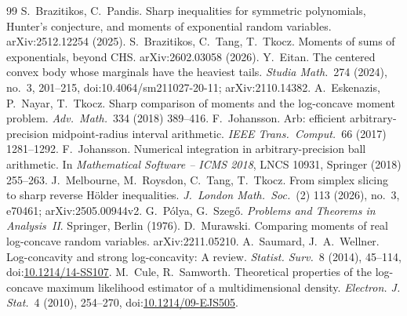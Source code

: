 \documentclass[11pt]{article}
\theoremstyle{remark}
\begin{document}
\begin{thebibliography}{99}
 S.~Brazitikos, C.~Pandis. Sharp inequalities for symmetric polynomials, Hunter's conjecture, and moments of exponential random variables. arXiv:2512.12254 (2025).
 S.~Brazitikos, C.~Tang, T.~Tkocz. Moments of sums of exponentials, beyond CHS. arXiv:2602.03058 (2026).
 Y.~Eitan. The centered convex body whose marginals have the heaviest tails. \emph{Studia Math.}\ 274 (2024), no.~3, 201--215, doi:10.4064/sm211027-20-11; arXiv:2110.14382.
 A.~Eskenazis, P.~Nayar, T.~Tkocz. Sharp comparison of moments and the log-concave moment problem. \emph{Adv.\ Math.}\ 334 (2018) 389--416.
 F.~Johansson. Arb: efficient arbitrary-precision midpoint-radius interval arithmetic. \emph{IEEE Trans.\ Comput.}\ 66 (2017) 1281--1292.
 F.~Johansson. Numerical integration in arbitrary-precision ball arithmetic. In \emph{Mathematical Software -- ICMS 2018}, LNCS 10931, Springer (2018) 255--263.
 J.~Melbourne, M.~Roysdon, C.~Tang, T.~Tkocz. From simplex slicing to sharp reverse H\"older inequalities. \emph{J.\ London Math.\ Soc.}\ (2) 113 (2026), no.~3, e70461; arXiv:2505.00944v2.
 G.~P\'olya, G.~Szeg\H{o}. \emph{Problems and Theorems in Analysis~II}. Springer, Berlin (1976).
 D.~Murawski. Comparing moments of real log-concave random variables. arXiv:2211.05210.
 A.~Saumard, J.~A.~Wellner.
Log-concavity and strong log-concavity: A review.
\emph{Statist. Surv.}\ 8 (2014), 45--114,
doi:\href{https://doi.org/10.1214/14-SS107}{10.1214/14-SS107}.
 M.~Cule, R.~Samworth.
Theoretical properties of the log-concave maximum likelihood estimator
of a multidimensional density.
\emph{Electron. J. Stat.}\ 4 (2010), 254--270,
doi:\href{https://doi.org/10.1214/09-EJS505}{10.1214/09-EJS505}.

\end{thebibliography}
\end{document}
